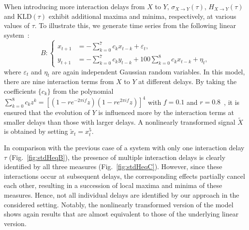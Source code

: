 \documentclass[12pt,aip,cha,reprint,nofootinbib]{revtex4-1}
\begin{document}
When introducing more interaction delays from $X$ to $Y$, $\sigma_{X\to Y}(\tau)$, $H_{X \to Y}(\tau)$ and $\text{KLD}(\tau)$ exhibit additional maxima and minima, respectively, at various values of $\tau$. To illustrate this, we generate time series from the following linear system~\cite{LiPRE2018}:
\begin{equation} \label{eq:C}
B: \left \{ \begin{aligned}
x_{t+1} &= - \sum_{k=0}^{7} c_k x_{t-k} + \varepsilon_t, \\
y_{t+1} &= - \sum_{k=0}^{7} c_k y_{t-k} + 100 \sum_{k=0}^{8} c_k x_{t-k} + \eta_t,
\end{aligned}
\right.
\end{equation}
where $\varepsilon_t$ and $\eta_t$ are again independent Gaussian random variables. In this model, there are nine interaction terms from $X$ to $Y$ at different delays. By taking the coefficients $\{ c_k \}$ from the polynomial $\sum_{k=0}^{8} c_k z^{k} = [(1 - r e^{-2\pi i f}z)(1 - r e^{2\pi i f} z)]^{4}$ with $f = 0.1$ and $r = 0.8$~\cite{LiPRE2018}, it is ensured that the evolution of $Y$ is influenced more by the interaction terms at smaller delays than those with larger delays. A nonlinearly transformed signal $\tilde{X}$ is obtained by setting $\tilde{x}_{t} = x_{t}^{5}$. 

In comparison with the previous case of a system with only one interaction delay $\tau$ (Fig.~\ref{fig:stdHeqB}), the presence of multiple interaction delays is clearly identified by all three measures (Fig.~\ref{fig:stdHeqC}). However, since these interactions occur at subsequent delays, the corresponding effects partially cancel each other, resulting in a succession of local maxima and minima of these measures. Hence, not all individual delays are identified by our approach in the considered setting. Notably, the nonlinearly transformed version of the model shows again results that are almost equivalent to those of the underlying linear version.
\end{document}
